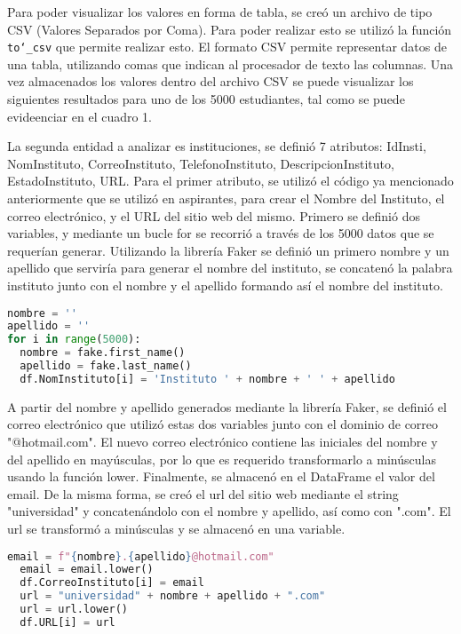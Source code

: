 \documentclass[10pt, oneside,spanish]{article}   	%
\begin{document}
 Para poder visualizar los valores en forma de tabla, se creó un archivo de tipo CSV (Valores Separados por Coma). Para poder realizar esto se utilizó la función \texttt{to\char`_csv} que permite realizar esto. El formato CSV permite representar datos de una tabla, utilizando comas que indican al procesador de texto las columnas. Una vez almacenados los valores dentro del archivo CSV se puede visualizar los siguientes resultados para uno de los 5000 estudiantes, tal como se puede evideenciar en el cuadro 1.
 
 La segunda entidad a analizar es instituciones, se definió 7 atributos: IdInsti, NomInstituto, CorreoInstituto, TelefonoInstituto, DescripcionInstituto, EstadoInstituto, URL. Para el primer atributo, se utilizó el código ya mencionado anteriormente que se utilizó en aspirantes, para crear el Nombre del Instituto, el correo electrónico, y el URL del sitio web del mismo. Primero se definió dos variables, y mediante un bucle for se recorrió a través de los 5000 datos que se requerían generar. Utilizando la librería Faker se definió un primero nombre y un apellido que serviría para generar el nombre del instituto, se concatenó la palabra instituto junto con el nombre y el apellido formando así el nombre del instituto.
 
    \begin{lstlisting}[language=Python, caption=Python example,numbers=none,xleftmargin=.15in,xrightmargin=.15in]  
nombre = ''
apellido = ''
for i in range(5000):
  nombre = fake.first_name()
  apellido = fake.last_name()
  df.NomInstituto[i] = 'Instituto ' + nombre + ' ' + apellido
  \end{lstlisting}
 A partir del nombre y apellido generados mediante la librería Faker, se definió el correo electrónico que utilizó estas dos variables junto con el dominio de correo "@hotmail.com". El nuevo correo electrónico contiene las iniciales del nombre y del apellido en mayúsculas, por lo que es requerido transformarlo a minúsculas usando la función lower. Finalmente, se almacenó en el DataFrame el valor del email. De la misma forma, se creó el url del sitio web mediante el string "universidad" y concatenándolo con el nombre y apellido, así como con ".com". El url se transformó a minúsculas y se almacenó en una variable.
  
    \begin{lstlisting}[language=Python, caption=Python example,numbers=none,xleftmargin=.15in,xrightmargin=.15in]  
  email = f"{nombre}.{apellido}@hotmail.com"
  email = email.lower()
  df.CorreoInstituto[i] = email
  url = "universidad" + nombre + apellido + ".com"
  url = url.lower()
  df.URL[i] = url
  \end{lstlisting}
  
\end{document}
